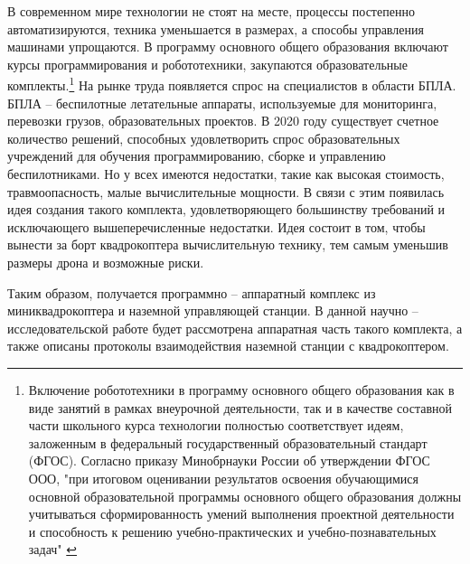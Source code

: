 В современном мире технологии не стоят на месте, процессы постепенно автоматизируются, техника уменьшается в размерах, а способы управления машинами упрощаются. В программу основного общего образования включают курсы программирования и робототехники, закупаются образовательные комплекты.\footnote{Включение робототехники в программу основного общего образования как в виде занятий в рамках внеурочной деятельности, так и в качестве составной части школьного курса технологии полностью соответствует идеям, заложенным в федеральный государственный образовательный стандарт (ФГОС). Согласно приказу Минобрнауки России об утверждении ФГОС ООО, "при итоговом оценивании результатов освоения обучающимися основной образовательной программы основного общего образования должны учитываться сформированность умений выполнения проектной деятельности и способность к решению учебно-практических и учебно-познавательных задач" \cite{minobr}}
На рынке труда появляется спрос на специалистов в области БПЛА. БПЛА -- беспилотные летательные аппараты, используемые для мониторинга, перевозки грузов, образовательных проектов. В 2020 году существует счетное количество решений, способных удовлетворить спрос образовательных учреждений для обучения программированию, сборке и управлению беспилотниками. Но у всех имеются недостатки, такие как высокая стоимость, травмоопасность, малые вычислительные мощности. В связи с этим появилась идея создания такого комплекта, удовлетворяющего большинству требований и исключающего вышеперечисленные недостатки. Идея состоит в том, чтобы вынести за борт квадрокоптера вычислительную технику, тем самым уменьшив размеры дрона и возможные риски.

Таким образом, получается программно -- аппаратный комплекс из миниквадрокоптера и наземной управляющей станции. В данной научно -- исследовательской работе будет рассмотрена аппаратная часть такого комплекта, а также описаны протоколы взаимодействия наземной станции с квадрокоптером.
